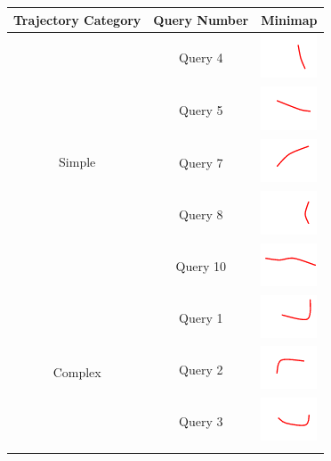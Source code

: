 \begin{table}[!tb] \centering
\begin{tabular}{|c|c|c|}
\hline
\multicolumn{1}{|c|}{\textbf{Trajectory Category}} & \textbf{Query Number} & \textbf{Minimap}\\ \hline
\multirow{5}{*}{Simple} & Query 4 & \includegraphics{image/minimaps/query_04.png} \\ \cline{2-3}
 & Query 5 & \includegraphics{image/minimaps/query_05.png} \\ \cline{2-3}
 & Query 7 & \includegraphics{image/minimaps/query_07.png} \\ \cline{2-3}
 & Query 8 & \includegraphics{image/minimaps/query_08.png} \\ \cline{2-3}
 & Query 10 & \includegraphics{image/minimaps/query_10.png} \\ \hline
\multirow{6}{*}{Complex} & Query 1 & \includegraphics{image/minimaps/query_01.png} \\ \cline{2-3}
 & Query 2 & \includegraphics{image/minimaps/query_02.png} \\ \cline{2-3}
 & Query 3 & \includegraphics{image/minimaps/query_03.png} \\ \cline{2-3}

\end{tabular}
\end{table}
